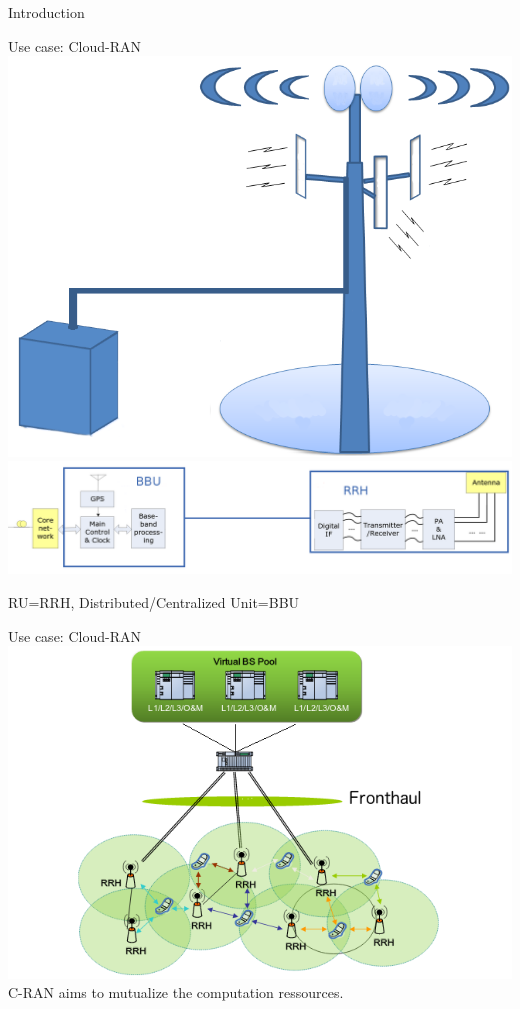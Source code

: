 \documentclass[10 pt]{beamer}
\begin{document}
\begin{section}{Introduction}
\begin{frame}{Use case: Cloud-RAN}
  \centering
  \includegraphics[scale=0.2]{cloudbts.png}\\
  \includegraphics[scale=0.175]{BBURRH.png}
  
   RU=RRH, Distributed/Centralized Unit=BBU
\end{frame}



\begin{frame}{Use case: Cloud-RAN}
  \centering
  \includegraphics[scale=0.3]{CRAN}\\
  \vspace{0.5cm}
  \pause
  C-RAN aims to mutualize the computation ressources.
  

\end{frame}
\end{section}
\end{document}
